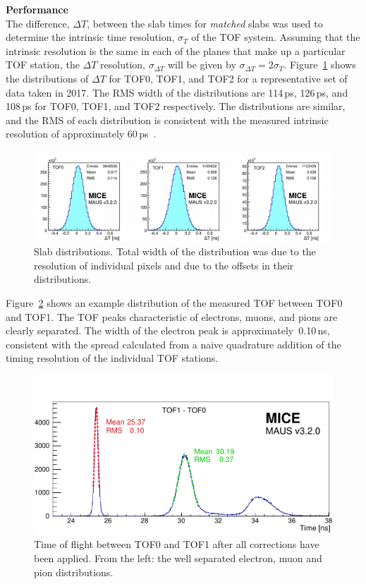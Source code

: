 \noindent\textbf{Performance} \\
\noindent
The difference, $\Delta T$, between the slab times for \textit{matched} slabs
was used to determine the intrinsic time resolution, $\sigma_T$ of the
TOF system.
Assuming that the intrinsic resolution is the same in each of the
planes that make up a particular TOF station, the $\Delta T$
resolution, $\sigma_{\Delta T}$ will be given by
$\sigma_{\Delta T}=2\sigma_T$.
Figure~\ref{fig:SlabDtAll} shows the distributions of $\Delta T$ for
TOF0, TOF1, and TOF2 for a representative set of data taken in 2017.
The RMS width of the distributions are 114\,ps, 126\,ps, and 108\,ps
for TOF0, TOF1, and TOF2 respectively.
The distributions are similar, and the RMS of each distribution is
consistent with the measured intrinsic resolution of approximately
60\,ps~\cite{2010NIMPA.615...14B}.
\begin{figure}
  \begin{center}
    \includegraphics[width=0.9\columnwidth]{07_overall_slab_dt_edited.pdf}
  \end{center}
  \caption{
    Slab \DT{} distributions.
    Total width of the distribution was due to the resolution of
    individual pixels and due to the offsets in their \DT{}
    distributions.
  }
  \label{fig:SlabDtAll}
\end{figure}

Figure~\ref{fig:TOF_peaks} shows an example distribution of the
measured TOF between TOF0 and TOF1.
The TOF peaks characteristic of electrons, muons, and pions are
clearly separated.
The width of the electron peak is approximately~0.10\,ns,
consistent with the spread calculated from a naive quadrature addition
of the timing resolution of the individual TOF stations.
\begin{figure}
  \begin{center}
    \includegraphics[width=0.6\columnwidth]{TOF_peaks.pdf}
  \end{center}
  \caption{
    Time of flight between TOF0 and TOF1 after all corrections have
    been applied. From the left: the well separated electron, muon and
    pion distributions.
  } 
  \label{fig:TOF_peaks}
\end{figure}
